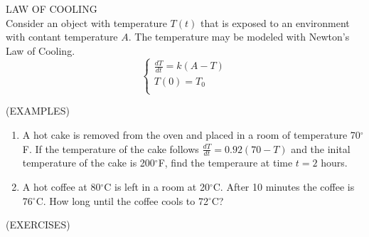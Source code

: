 \documentclass[11pt]{article}
\begin{document}
\pagebreak

LAW OF COOLING \\
Consider an object with temperature $T(t)$ that is exposed to an environment with contant temperature $A$.  The temperature may be
modeled with Newton's Law of Cooling.
\begin{displaymath}
  \left\{ \begin{array}{ll}
\frac{dT}{dt} = k(A-T) \\
T(0) = T_0 \\
\end{array} \right.
\end{displaymath}

\vspace{1.5in}

(EXAMPLES)
\begin{enumerate}
\item{A hot cake is removed from the oven and placed in a room of temperature 70$^{\circ}$F.  If the temperature of the cake
  follows $\frac{dT}{dt} = 0.92(70-T)$ and the inital temperature of the cake is 200$^{\circ}$F, find the temperaure at time $t=2$ hours.}
  \vspace{3in}

\pagebreak
\item{A hot coffee at 80$^{\circ}$C is left in a room at 20$^{\circ}$C.  After 10 minutes the coffee is 76$^{\circ}$C.  How long until the
coffee cools to 72$^{\circ}$C?}

\end{enumerate}



\vspace{5in}

(EXERCISES)
\end{document}
